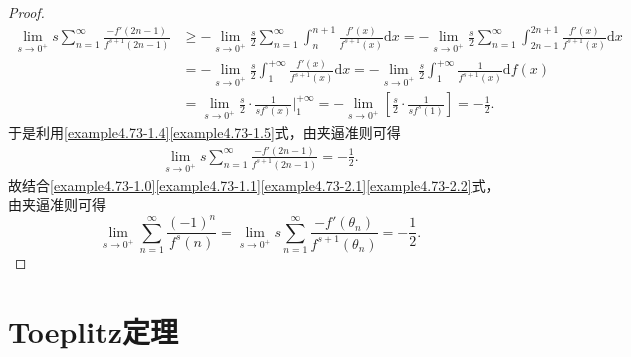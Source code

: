 \documentclass[lang=cn,newtx,10pt,scheme=chinese]{elegantbook}
\begin{document}
\begin{proof}
   \begin{align}
      \underset{s\rightarrow 0^+}{\lim}s\sum_{n=1}^{\infty}{\frac{-f'\left( 2n-1 \right)}{f^{s+1}\left( 2n-1 \right)}}&\geqslant -\underset{s\rightarrow 0^+}{\lim}\frac{s}{2}\sum_{n=1}^{\infty}{\int_n^{n+1}{\frac{f'\left( x \right)}{f^{s+1}\left( x \right)}\mathrm{d}x}}=-\underset{s\rightarrow 0^+}{\lim}\frac{s}{2}\sum_{n=1}^{\infty}{\int_{2n-1}^{2n+1}{\frac{f'\left( x \right)}{f^{s+1}\left( x \right)}\mathrm{d}x}}
      \nonumber
      \\
      &=-\underset{s\rightarrow 0^+}{\lim}\frac{s}{2}\int_1^{+\infty}{\frac{f'\left( x \right)}{f^{s+1}\left( x \right)}\mathrm{d}x}=-\underset{s\rightarrow 0^+}{\lim}\frac{s}{2}\int_1^{+\infty}{\frac{1}{f^{s+1}\left( x \right)}\mathrm{d}f\left( x \right)}
      \nonumber
      \\
      &=\underset{s\rightarrow 0^+}{\lim}\frac{s}{2}\cdot \frac{1}{sf^s\left( x \right)}\Big|_{1}^{+\infty}=-\underset{s\rightarrow 0^+}{\lim}\left[ \frac{s}{2}\cdot \frac{1}{sf^s\left( 1 \right)} \right] =-\frac{1}{2}.\label{example4.73-1.5}
   \end{align}
   于是利用\eqref{example4.73-1.4}\eqref{example4.73-1.5}式，由夹逼准则可得
   \begin{align}
     \lim_{s\rightarrow 0^+}s\sum_{n = 1}^{\infty}\frac{-f'(2n - 1)}{f^{s + 1}(2n - 1)} = -\frac{1}{2}. \label{example4.73-2.2} 
   \end{align}
   故结合\eqref{example4.73-1.0}\eqref{example4.73-1.1}\eqref{example4.73-2.1}\eqref{example4.73-2.2}式，由夹逼准则可得
   \[
   \lim_{s\rightarrow 0^+} \sum_{n = 1}^{\infty}\frac{(-1)^n}{f^s(n)} = \lim_{s\rightarrow 0^+} s\sum_{n = 1}^{\infty}\frac{-f'(\theta_n)}{f^{s + 1}(\theta_n)} = -\frac{1}{2}.
   \]
\end{proof}


\section{Toeplitz定理}
\end{document}

